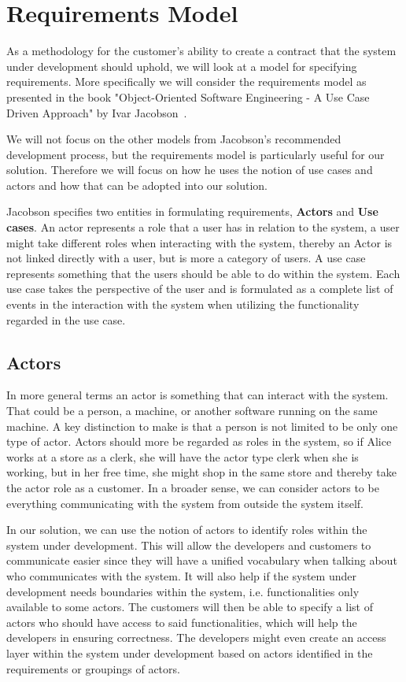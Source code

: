 \section{Requirements Model}

As a methodology for the customer's ability to create a contract that the system under development should uphold, we will look at a model for specifying requirements.
More specifically we will consider the requirements model as presented in the book "Object-Oriented Software Engineering - A Use Case Driven Approach" by Ivar Jacobson~\cite{Jacobson1992}.

We will not focus on the other models from Jacobson's recommended development process, but the requirements model is particularly useful for our solution.
Therefore we will focus on how he uses the notion of use cases and actors and how that can be adopted into our solution.

Jacobson specifies two entities in formulating requirements, \textbf{Actors} and \textbf{Use cases}.
An actor represents a role that a user has in relation to the system, a user might take different roles when interacting with the system, thereby an Actor is not linked directly with a user, but is more a category of users.
A use case represents something that the users should be able to do within the system.
Each use case takes the perspective of the user and is formulated as a complete list of events in the interaction with the system when utilizing the functionality regarded in the use case.

\subsection{Actors}
In more general terms an actor is something that can interact with the system. That could be a person, a machine, or another software running on the same machine. 
A key distinction to make is that a person is not limited to be only one type of actor.
Actors should more be regarded as roles in the system, so if Alice works at a store as a clerk, she will have the actor type clerk when she is working, but in her free time, she might shop in the same store and thereby take the actor role as a customer. 
In a broader sense, we can consider actors to be everything communicating with the system from outside the system itself.

In our solution, we can use the notion of actors to identify roles within the system under development.
This will allow the developers and customers to communicate easier since they will have a unified vocabulary when talking about who communicates with the system. 
It will also help if the system under development needs boundaries within the system, i.e. functionalities only available to some actors.
The customers will then be able to specify a list of actors who should have access to said functionalities, which will help the developers in ensuring correctness.
The developers might even create an access layer within the system under development based on actors identified in the requirements or groupings of actors.

